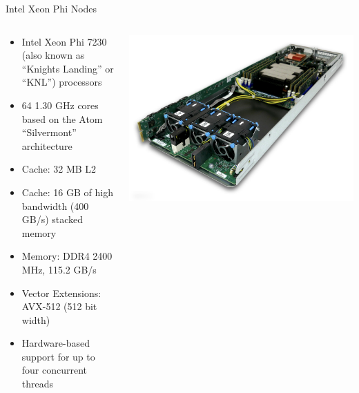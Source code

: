 \begin{frame}{Intel Xeon Phi Nodes}
\begin{columns}
\begin{column}{0.5\textwidth}
\begin{itemize}
\item Intel Xeon Phi 7230 (also known as ``Knights Landing'' or ``KNL'') processors
\item 64 1.30 GHz cores based on the Atom ``Silvermont'' architecture
\item Cache: 32 MB L2
\item Cache: 16 GB of high bandwidth (400 GB/s) stacked memory
\item Memory: DDR4 2400 MHz, 115.2 GB/s
\item Vector Extensions: AVX-512 (512 bit width)
\item Hardware-based support for up to four concurrent threads
\end{itemize}
\end{column}
\begin{column}{0.5\textwidth}
\begin{center}
\includegraphics[width=\textwidth]{figures/mic_sled.jpg}
\end{center}
\end{column}
\end{columns}
\end{frame}

